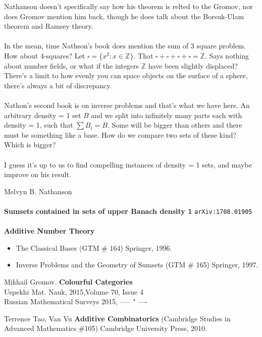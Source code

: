 \documentclass[12pt]{article}
\begin{document}
\newpage

\noindent Nathanson doesn't specifically say how his theorem is relted to the Gromov, nor does Gromov mention him back, though he does talk about the Borsuk-Ulam theorem and Ramsey theory. \\ \\
In the mean, time Nathson's book does mention the sum of 3 square problem.  How about 4-squares?  Let $\square = \{ x^2 : x \in \mathbb{Z}\}$. That $\square + \square + \square + \square = \mathbb{Z}$.  Says nothing about number fields, or what if the integers $\mathbb{Z}$ have been slightly displaced?  There's a limit to how evenly you can space objects on the surface of a sphere, there's always a bit of discrepancy. \\ \\
Nathon's second book is on {inverse problems} and that's what we have here.  An arbitrary density = 1 set $B$ and we split into infinitely many parts each with density = 1, such that $\sum B_i = B$.   Some will be bigger than others and there must be something like a base.  How do we compare two sets of these kind?  {Which is bigger}? \\ \\
I guess it's up to us to {find} compelling instances of density = 1 sets, and maybe improve on his result.

\vfill

\begin{thebibliography}{}

\item  Melvyn B. Nathanson  \\
\\ \textbf{Sumsets contained in sets of upper Banach density 1} \texttt{arXiv:1708.01905} \\\\
\textbf{Additive Number Theory}
\begin{itemize}
\item  The Classical Bases (GTM \# 164) Springer, 1996. 
\item  Inverse Problems and the Geometry of Sumsets (GTM \# 165) Springer, 1997.
\end{itemize}

\item Mikhail Gromov. \textbf{Colourful Categories} \\
Uspekhi Mat. Nauk, 	\hspace{0.85in} 2015,Volume 70,	Issue 4	\\
Russian Mathematical Surveys 2015, ----- " ----

\item Terrence Tao, Van Vu \textbf{Additive Combinatorics} (Cambridge Studies in Advanced Mathematics \#105) Cambridge University Press, 2010. 

\end{thebibliography}
\end{document}
